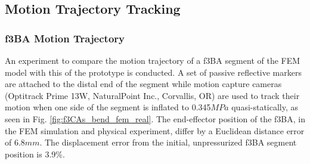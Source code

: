 \documentclass[letterpaper, 10 pt, conference]{ieeeconf}  %
\begin{document}
\subsection{Motion Trajectory Tracking}

\subsubsection{f3BA Motion Trajectory}

An experiment to compare the motion trajectory of a f3BA segment of the FEM model with this of the prototype is conducted. A set of passive reflective markers are attached to the distal end of the segment while motion capture cameras (Optitrack Prime 13W, NaturalPoint Inc., Corvallis, OR) are used to track their motion when one side of the segment is inflated to 0.345$MPa$ quasi-statically, as seen in Fig. \ref{fig:f3CAs_bend_fem_real}. The end-effector position of the f3BA, in the FEM simulation and physical experiment, differ by a Euclidean distance error of 6.8$mm$. The displacement error from the initial, unpressurized f3BA segment position is 3.9\%. 

% 
% 
% 
\end{document}
